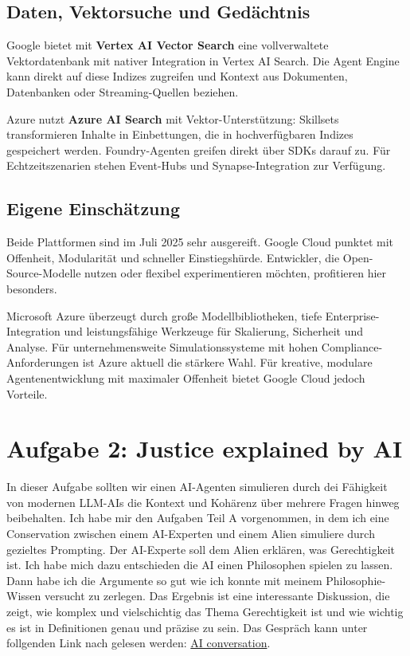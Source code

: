 \documentclass[a4paper,12pt]{scrartcl}
\begin{document}
\subsection*{Daten, Vektorsuche und Gedächtnis}
Google bietet mit \textbf{Vertex AI Vector Search} eine vollverwaltete Vektordatenbank mit nativer Integration in Vertex AI Search. Die Agent Engine kann direkt auf diese Indizes zugreifen und Kontext aus Dokumenten, Datenbanken oder Streaming-Quellen beziehen.

Azure nutzt \textbf{Azure AI Search} mit Vektor-Unterstützung: Skillsets transformieren Inhalte in Einbettungen, die in hochverfügbaren Indizes gespeichert werden. Foundry-Agenten greifen direkt über SDKs darauf zu. Für Echtzeitszenarien stehen Event-Hubs und Synapse-Integration zur Verfügung.

\subsection*{Eigene Einschätzung}
Beide Plattformen sind im Juli 2025 sehr ausgereift. Google Cloud punktet mit Offenheit, Modularität und schneller Einstiegshürde. Entwickler, die Open-Source-Modelle nutzen oder flexibel experimentieren möchten, profitieren hier besonders. 

Microsoft Azure überzeugt durch große Modellbibliotheken, tiefe Enterprise-Integration und leistungsfähige Werkzeuge für Skalierung, Sicherheit und Analyse. Für unternehmensweite Simulationssysteme mit hohen Compliance-Anforderungen ist Azure aktuell die stärkere Wahl. Für kreative, modulare Agentenentwicklung mit maximaler Offenheit bietet Google Cloud jedoch Vorteile.


\section*{Aufgabe 2: Justice explained by AI}
In dieser Aufgabe sollten wir einen AI-Agenten simulieren durch dei Fähigkeit von modernen LLM-AIs die Kontext und Kohärenz über mehrere Fragen hinweg beibehalten. Ich habe mir den Aufgaben Teil A vorgenommen, in dem ich eine Conservation zwischen einem AI-Experten und einem Alien simuliere durch gezieltes Prompting. Der AI-Experte soll dem Alien erklären, was Gerechtigkeit ist. Ich habe mich dazu entschieden die AI einen Philosophen spielen zu lassen. Dann habe ich die Argumente so gut wie ich konnte mit meinem Philosophie-Wissen versucht zu zerlegen. Das Ergebnis ist eine interessante Diskussion, die zeigt, wie komplex und vielschichtig das Thema Gerechtigkeit ist und wie wichtig es ist in Definitionen genau und präzise zu sein. Das Gespräch kann unter follgenden Link nach gelesen werden: \href{https://g.co/gemini/share/98469b7d8c1a}{AI conversation}.
\end{document}
